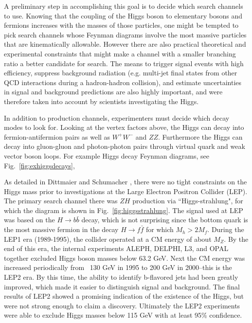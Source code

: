 A preliminary step in accomplishing this goal is to decide which search 
channels to use. Knowing that the coupling of the Higgs boson to elementary 
bosons and fermions increases with the masses of those particles, one might be 
tempted to pick search channels whose Feynman diagrams involve the most massive
particles that are kinematically allowable. However there are 
also practical theoretical and experimental constraints that might make a 
channel with a smaller branching ratio a better candidate for search. The 
means to trigger signal events with high efficiency, suppress background 
radiation (e.g. multi-jet final states from other QCD interactions during a
hadron-hadron collision), and estimate uncertainties in signal and background 
predictions are also highly important, and were therefore taken into account by
scientists investigating the Higgs.

In addition to production channels, experimenters must decide which
decay modes to look for. Looking at the vertex factors above, the Higgs 
can decay into fermion-antifermion pairs as well as $W^{+}W^{-}$ and $ZZ$.
Furthermore the Higgs can decay into gluon-gluon and photon-photon pairs
through virtual quark and weak vector boson loops. For example Higgs decay
Feynman diagrams, see Fig.~\ref{fig:exhiggsdecays},

As detailed in Dittmaier and Schumacher \cite{dittmaier_higgs_2013}, 
there were no tight
constraints on the Higgs mass prior to investigations at the Large Electron
Positron Collider (LEP). The primary search
channel there was $ZH$ production via ``Higgs-strahlung", for which the diagram
is shown in Fig.~\ref{fig:higgsstrahlung}. 
The signal used at LEP was based on the $H\to b\bar{b}$ 
decay, which is not surprising since the bottom quark is the most 
massive fermion in the decay $H\to f\bar{f}$ for which $M_{h}>2M_{f}$. During
the LEP1 era (1989-1995), the collider operated at a CM energy of about $M_Z$. 
By the end of this era, the internal experiments ALEPH, DELPHI, L3, and OPAL 
together excluded Higgs boson masses below 63.2 GeV. Next the CM energy was
increased periodically from ~130 GeV in 1995 to 200 GeV in 2000--this is the
LEP2 era. By this time, the ability to identify b-flavored jets had been
greatly improved, which made it easier to distinguish signal and background. 
The final results of LEP2 showed a promising indication of the existence of
the Higgs, but were not strong enough to claim a discovery. Ultimately
the LEP2 experiments were able to exclude Higgs masses below 115 GeV with at
least 95\% confidence.

